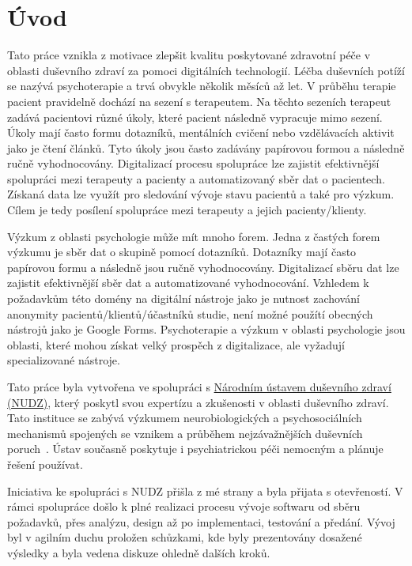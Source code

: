 \chapter*{Úvod}

Tato práce vznikla z motivace zlepšit kvalitu poskytované zdravotní péče v oblasti duševního zdraví za pomoci digitálních technologií.
Léčba duševních potíží se nazývá psychoterapie a trvá obvykle několik měsíců až let.
V průběhu terapie pacient pravidelně dochází na sezení s terapeutem.
Na těchto sezeních terapeut zadává pacientovi různé úkoly, které pacient následně vypracuje mimo sezení.
Úkoly mají často formu dotazníků, mentálních cvičení nebo vzdělávacích aktivit jako je čtení článků.
Tyto úkoly jsou často zadávány papírovou formou a následně ručně vyhodnocovány.
Digitalizací procesu spolupráce lze zajistit efektivnější spolupráci mezi terapeuty a pacienty a automatizovaný sběr dat o pacientech.
Získaná data lze využít pro sledování vývoje stavu pacientů a také pro výzkum.
Cílem je tedy posílení spolupráce mezi terapeuty a jejich pacienty/klienty.

Výzkum z oblasti psychologie může mít mnoho forem.
Jedna z častých forem výzkumu je sběr dat o skupině pomocí dotazníků.
Dotazníky mají často papírovou formu a následně jsou ručně vyhodnocovány.
Digitalizací sběru dat lze zajistit efektivnější sběr dat a automatizované vyhodnocování.
Vzhledem k požadavkům této domény na digitální nástroje jako je nutnost zachování anonymity pacientů/klientů/účastníků studie, není možné použítí obecných nástrojů jako je Google Forms.
Psychoterapie a výzkum v oblasti psychologie jsou oblasti, které mohou získat velký prospěch z digitalizace, ale vyžadují specializované nástroje.

Tato práce byla vytvořena ve spolupráci s \href{https://www.nudz.cz/}{Národním ústavem duševního zdraví (NUDZ)}, který poskytl svou expertízu a zkušenosti v oblasti duševního zdraví.
Tato instituce se zabývá výzkumem neurobiologických a psychosociálních mechanismů spojených se vznikem a průběhem nejzávažnějších duševních poruch~\cite{nudz-profil}.
Ústav současně poskytuje i psychiatrickou péči nemocným a plánuje řešení používat.

Iniciativa ke spolupráci s NUDZ přišla z mé strany a byla přijata s otevřeností.
V rámci spolupráce došlo k plné realizaci procesu vývoje softwaru od sběru požadavků, přes analýzu, design až po implementaci, testování a předání.
Vývoj byl v agilním duchu proložen schůzkami, kde byly prezentovány dosažené výsledky a byla vedena diskuze ohledně dalších kroků.

